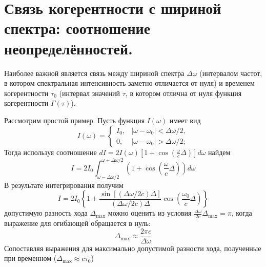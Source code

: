 \documentclass[a4paper, 12pt]{book}
\begin{document}
	\section{Связь когерентности с шириной спектра: соотношение неопределённостей.}
	Наиболее важной является связь между шириной спектра $\Delta\omega$ (интервалом частот, в котором спектральная интенсивность заметно отличается от нуля) и временем когерентности $\tau_0$ (интервал значений $\tau$, в котором отлична от нуля функция когерентности $\Gamma\left(\tau\right)$).\par
	Рассмотрим простой пример. Пусть функция $I\left(\omega\right)$ имеет вид
	\begin{equation*}
		I\left(\omega\right)=\begin{cases}
			I_0, & \left|\omega-\omega_0\right|<\Delta\omega/2,\\
			0, & \left|\omega-\omega_0\right|>\Delta\omega/2;
		\end{cases}
	\end{equation*}
	Тогда используя соотношение $dI=2I\left(\omega\right)\left[1+\cos\left(\frac{\omega}{c}\Delta\right)\right]d\omega$ найдем
	\begin{equation}
		I=2I_0\int^{\omega+\Delta\omega/2}_{\omega-\Delta\omega/2}\left(1+\cos\left(\frac{\omega}{c}\Delta\right)\right)d\omega
	\end{equation}
	В результате интегрирования получим
	\begin{equation}
		I=2I_0\left\{1+\frac{\sin\left[\left(\Delta\omega/2c\right)\Delta\right]}{\left(\Delta\omega/2c\right)\Delta}\cos\left(\frac{\omega_0}{c}\Delta\right)\right\}
	\end{equation}
	допустимую разность хода $\Delta_{\max}$ можно оценить из условия $\frac{\Delta\omega}{2c}\Delta_{\max}=\pi$, когда выражение для огибающей обращается в нуль:
	\begin{equation*}
		\Delta_{\max}\approx\frac{2\pi c}{\Delta\omega}
	\end{equation*}
	Сопоставляя выражения для максимально допустимой разности хода, полученные при временном ($\Delta_{\max}\approx c\tau_0$) 
\end{document}
